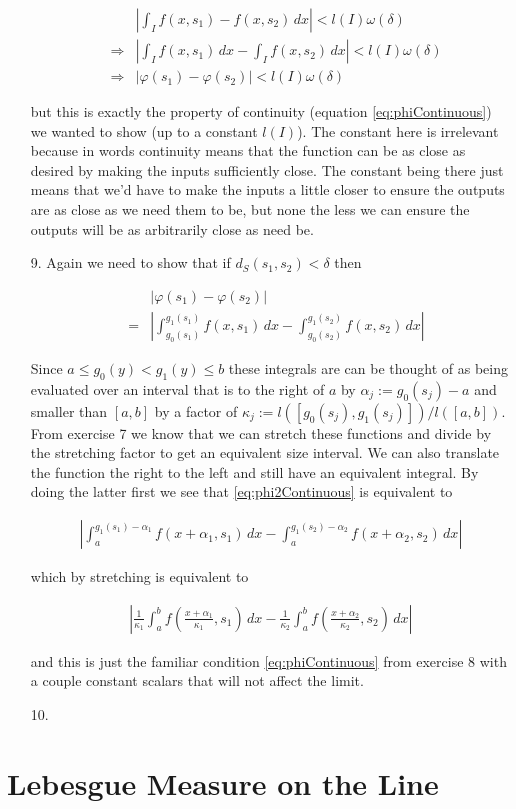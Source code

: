 \documentclass[oneside]{book}
\begin{document}
\begin{enumerate}
\begin{eqnarray}
&&\left| \int_I f(x,s_1)-f(x,s_2)\, dx \right | < l(I)\omega(\delta) \nonumber \\
&\Rightarrow& \left| \int_I f(x,s_1)\,dx- \int_I f(x,s_2)\, dx \right | < l(I)\omega(\delta) \nonumber \\
&\Rightarrow& \left| \varphi(s_1) - \varphi(s_2) \right| < l(I)\omega(\delta)
\end{eqnarray}

but this is exactly the property of continuity (equation \ref{eq:phiContinuous}) we wanted to show (up to a constant $l(I)$). The constant here is irrelevant because in words continuity means that the function can be as close as desired by making the inputs sufficiently close. The constant being there just means that we'd have to make the inputs a little closer to ensure the outputs are as close as we need them to be, but none the less we can ensure the outputs will be as arbitrarily close as need be.

\item[9.] Again we need to show that if  $d_S(s_1,s_2) < \delta$ then

\begin{eqnarray}
\label{eq:phi2Continuous}
&&\left| \varphi(s_1) - \varphi(s_2) \right| \nonumber\\
&=&\left| \int_{g_0(s_1)}^{g_1(s_1)} f(x,s_1)\, dx - \int_{g_0(s_2)}^{g_1(s_2)} f(x,s_2)\, dx \right |
\end{eqnarray}

Since $a \le g_0(y) < g_1(y) \le b$ these integrals are can be thought of as being evaluated over an interval that is to the right of $a$ by $\alpha_j := g_0(s_j)-a$ and smaller than $[a,b]$ by a factor of $\kappa_j :=l([g_0(s_j),g_1(s_j)])/l([a,b])$. From exercise 7 we know that we can stretch these functions and divide by the stretching factor to get an equivalent size interval. We can also translate the function the right to the left and still have an equivalent integral. By doing the latter first we see that \ref{eq:phi2Continuous} is equivalent to

\begin{eqnarray}
\left| \int_{a}^{g_1(s_1)-\alpha_1} f(x+\alpha_1,s_1)\, dx - \int_{a}^{g_1(s_2)-\alpha_2} f(x+\alpha_2,s_2)\, dx \right |
\end{eqnarray}

which by stretching is equivalent to

\begin{eqnarray}
\left| \frac{1}{\kappa_1} \int_{a}^{b} f\left(\frac{x+\alpha_1}{\kappa_1},s_1\right)\, dx - \frac{1}{\kappa_2} \int_{a}^{b} f\left(\frac{x+\alpha_2}{\kappa_2},s_2\right)\, dx \right|
\end{eqnarray}

and this is just the familiar condition \ref{eq:phiContinuous} from exercise 8 with a couple constant scalars that will not affect the limit.

\item[10.]

\end{enumerate}
\chapter{Lebesgue Measure on the Line}
\end{document}
